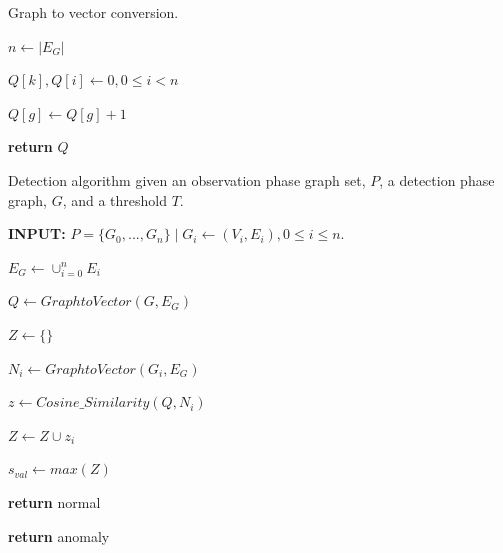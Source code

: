\begin{algorithm}[h!]  
\caption{Graph to vector conversion.} 
 \label{graph_to_vector} 
\begin{algorithmic}[1]


\State $n \gets |E_G|$

\State $Q[k],Q[i] \gets 0, 0 \leq i < n$




\State $Q[g] \gets Q[g] + 1$
\EndIf

\EndFor

\EndFor


\State \textbf{return} $Q$

\EndProcedure

\end{algorithmic}
\end{algorithm}


\begin{algorithm}[h!]

\caption{Detection algorithm given an observation phase graph set, $P$, a detection phase graph, $G$, and a threshold $T$.} 
 \label{alg:graph_anomaly} 

\begin{algorithmic}[1]  


\State \textbf{INPUT: } $P=\{G_0,...,G_n\} \mid G_i\gets (V_i, E_i), 0 \leq i \leq n.$

\State $E_G \gets \cup_{i=0}^{n} E_i$

\State $Q \gets GraphtoVector(G, E_G)$ 

\State $Z \gets \{\}$

\State $N_i \gets GraphtoVector(G_i, E_G)$

\State $z \gets Cosine\_Similarity(Q, N_i)$

\State $Z \gets Z \cup z_i$

\EndFor	

\State $s_{val} \gets max(Z)$

\State \textbf{return} normal

\EndIf

\State \textbf{return} anomaly
\EndProcedure
\end{algorithmic}
\end{algorithm}

